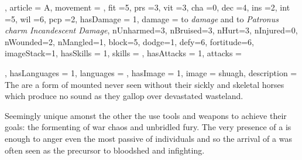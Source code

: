 {{

, article = A, movement = , fit =5, prs =3, vit =3, cha =0, dec =4, ins =2, int =5, wil =6, pcp =2, hasDamage = 1, damage = to \textit{ damage} and  to \textit{Patronus charm\comma{} Incandescent Damage}, nUnharmed=3, nBruised=3, nHurt=3, nInjured=0, nWounded=2, nMangled=1, block=5, dodge=1, defy=6, fortitude=6, imageStack=1, hasSkills = 1, skills = 
, hasAttacks = 1, attacks = 

, hasLanguages = 1, languages = , hasImage = 1, image = shuagh, description = The \name{} are a form of mounted \comma{} never seen without their sickly and skeletal horses\comma{} which produce no sound as they gallop over devastated wasteland. 

Seemingly unique amonst the other \comma{} the \name{} use tools and weapons to achieve their goals: the formenting of war\comma{} chaos and unbridled fury. The very presence of a \name{} is enough to anger even the most passive of individuals\comma{} and so the arrival of a \name{} was often seen as the precursor to bloodshed and infighting.}

}




